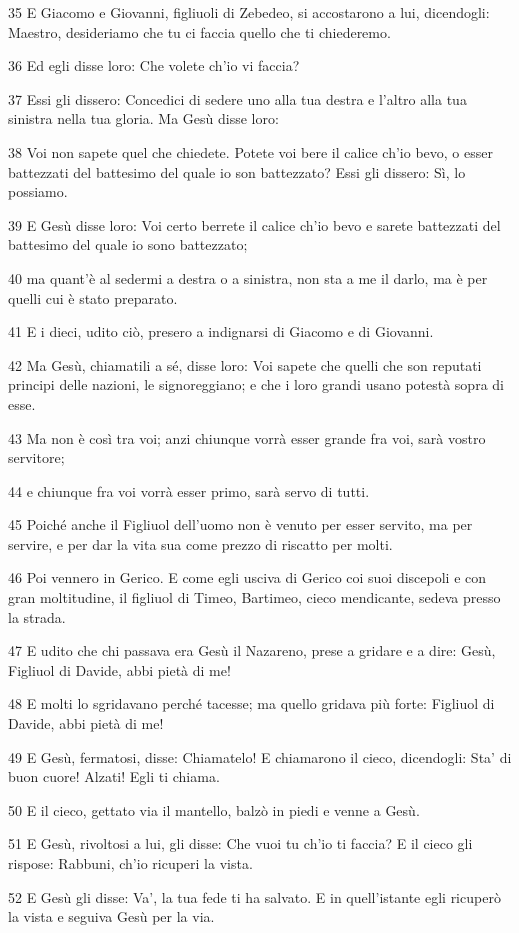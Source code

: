\par 35 E Giacomo e Giovanni, figliuoli di Zebedeo, si accostarono a lui, dicendogli: Maestro, desideriamo che tu ci faccia quello che ti chiederemo.
\par 36 Ed egli disse loro: Che volete ch'io vi faccia?
\par 37 Essi gli dissero: Concedici di sedere uno alla tua destra e l'altro alla tua sinistra nella tua gloria. Ma Gesù disse loro:
\par 38 Voi non sapete quel che chiedete. Potete voi bere il calice ch'io bevo, o esser battezzati del battesimo del quale io son battezzato? Essi gli dissero: Sì, lo possiamo.
\par 39 E Gesù disse loro: Voi certo berrete il calice ch'io bevo e sarete battezzati del battesimo del quale io sono battezzato;
\par 40 ma quant'è al sedermi a destra o a sinistra, non sta a me il darlo, ma è per quelli cui è stato preparato.
\par 41 E i dieci, udito ciò, presero a indignarsi di Giacomo e di Giovanni.
\par 42 Ma Gesù, chiamatili a sé, disse loro: Voi sapete che quelli che son reputati principi delle nazioni, le signoreggiano; e che i loro grandi usano potestà sopra di esse.
\par 43 Ma non è così tra voi; anzi chiunque vorrà esser grande fra voi, sarà vostro servitore;
\par 44 e chiunque fra voi vorrà esser primo, sarà servo di tutti.
\par 45 Poiché anche il Figliuol dell'uomo non è venuto per esser servito, ma per servire, e per dar la vita sua come prezzo di riscatto per molti.
\par 46 Poi vennero in Gerico. E come egli usciva di Gerico coi suoi discepoli e con gran moltitudine, il figliuol di Timeo, Bartimeo, cieco mendicante, sedeva presso la strada.
\par 47 E udito che chi passava era Gesù il Nazareno, prese a gridare e a dire: Gesù, Figliuol di Davide, abbi pietà di me!
\par 48 E molti lo sgridavano perché tacesse; ma quello gridava più forte: Figliuol di Davide, abbi pietà di me!
\par 49 E Gesù, fermatosi, disse: Chiamatelo! E chiamarono il cieco, dicendogli: Sta' di buon cuore! Alzati! Egli ti chiama.
\par 50 E il cieco, gettato via il mantello, balzò in piedi e venne a Gesù.
\par 51 E Gesù, rivoltosi a lui, gli disse: Che vuoi tu ch'io ti faccia? E il cieco gli rispose: Rabbuni, ch'io ricuperi la vista.
\par 52 E Gesù gli disse: Va', la tua fede ti ha salvato. E in quell'istante egli ricuperò la vista e seguiva Gesù per la via.

